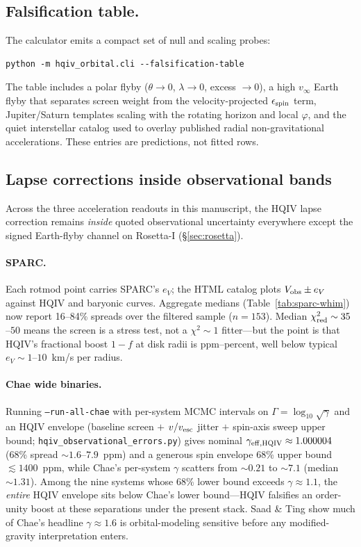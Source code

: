 \documentclass[11pt]{amsart}
\begin{document}
\subsection{Falsification table.}
The calculator emits a compact set of null and scaling probes:
\begin{verbatim}
python -m hqiv_orbital.cli --falsification-table
\end{verbatim}
The table includes a polar flyby ($\theta\to0$, $\lambda\to0$, excess $\to0$), a high
$v_\infty$ Earth flyby that separates screen weight from the velocity-projected
$\epsilon_{\rm spin}$ term, Jupiter/Saturn templates scaling with the rotating horizon and local
$\varphi$, and the quiet interstellar catalog used to overlay published radial
non-gravitational accelerations. These entries are predictions, not fitted rows.

\subsection{Lapse corrections inside observational bands}\label{sec:inside-bands}
Across the three acceleration readouts in this manuscript, the HQIV lapse correction
remains \emph{inside} quoted observational uncertainty everywhere except the signed
Earth-flyby channel on Rosetta-I (\S\ref{sec:rosetta}).

\paragraph{SPARC.}
Each rotmod point carries SPARC's $e_V$; the HTML catalog plots $V_{\rm obs}\pm e_V$
against HQIV and baryonic curves. Aggregate medians (Table~\ref{tab:sparc-whim}) now
report 16--84\% spreads over the filtered sample ($n=153$). Median $\chi^2_{\rm red}\sim 35$--$50$
means the screen is a stress test, not a $\chi^2\sim 1$ fitter---but the point is that
HQIV's fractional boost $1-f$ at disk radii is ppm--percent, well below typical $e_V\sim 1$--$10$~km/s
per radius.

\paragraph{Chae wide binaries.}
Running \texttt{--run-all-chae} with per-system MCMC intervals on $\Gamma=\log_{10}\sqrt{\gamma}$
and an HQIV envelope (baseline screen $+$ $v/v_{\rm esc}$ jitter $+$ spin-axis sweep upper
bound; \texttt{hqiv\_observational\_errors.py}) gives nominal
$\gamma_{\rm eff,HQIV}\approx1.000004$ (68\% spread $\sim1.6$--$7.9$~ppm) and a generous
spin envelope 68\% upper bound $\lesssim1400$~ppm, while Chae's per-system $\gamma$ scatters
from $\sim0.21$ to $\sim7.1$ (median $\sim1.31$). Among the nine systems whose 68\% lower
bound exceeds $\gamma\approx1.1$, the \emph{entire} HQIV envelope sits below Chae's lower
bound---HQIV falsifies an order-unity boost at these separations under the present stack.
Saad \& Ting \cite{saad2026wide} show much of Chae's headline $\gamma\approx1.6$ is
orbital-modeling sensitive before any modified-gravity interpretation enters.
\end{document}
